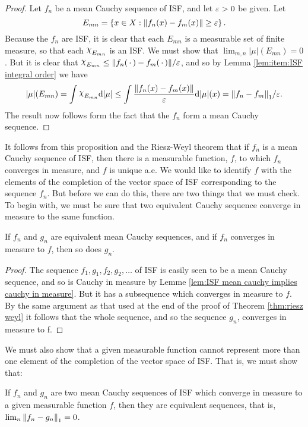 \begin{proof}
Let $f_n$ be a mean Cauchy sequence of ISF, and let $\varepsilon>0$ be given. Let \[E_{mn}=\left\{x\in X:\norm{f_n(x)-f_m(x)}\geq\varepsilon\right\}.\] Because the $f_n$ are ISF, it is clear that each $E_{mn}$ is a measurable set of finite measure, so that each $\idf{E_{mn}}$ is an ISF. We must show that $\lim_{m,n}|\mu|(E_{mn})=0$. But it is clear that $\idf{E_{mn}}\leq\norm{f_n(\imarg)-f_m(\imarg)}/\ep$, and so by Lemma \ref{lem:item:ISF integral order} we have \[|\mu|(E_{mn})=\int\idf{E_{mn}}\dd|\mu|\leq\int\frac{\norm{f_n(x)-f_m(x)}}{\ep}\dd|\mu|(x)=\norm{f_n-f_m}_1/\ep.\] The result now follows form the fact that the $f_n$ form a mean Cauchy sequence.
\end{proof}

It follows from this proposition and the Riesz-Weyl theorem that if $f_n$ is a mean Cauchy sequence of ISF, then there is a measurable function, $f$, to which $f_n$ converges in measure, and $f$ is unique a.e. We would like to identify $f$ with the elements of the completion of the vector space of ISF corresponding to the sequence $f_n$. But before we can do this, there are two things that we must check. To begin with, we must be sure that two equivalent Cauchy sequence converge in measure to the same function.

\begin{lemma}
If $f_n$ and $g_n$ are equivalent mean Cauchy sequences, and if $f_n$ converges in measure to $f$, then so does $g_n$.
\end{lemma}

\begin{proof}
The sequence $f_1,g_1,f_2,g_2,\dots$ of ISF is easily seen to be a mean Cauchy sequence, and so is Cauchy in measure by Lemme \ref{lem:ISF mean cauchy implies cauchy in measure}. But it has a subsequence which converges in measure to $f$. By the same argument as that used at the end of the proof of Theorem \ref{thm:riesz weyl} it follows that the whole sequence, and so the sequence $g_n$, converges in measure to f.
\end{proof}

We must also show that a given measurable function cannot represent more than one element of the completion of the vector space of ISF. That is, we must show that:

\begin{keylemma}\label{lem:ISF key lem}
If $f_n$ and $g_n$ are two mean Cauchy sequences of ISF which converge in measure to a given measurable function $f$, then they are equivalent sequences, that is, $\lim_n\norm{f_n-g_n}_1=0$.
\end{keylemma}

